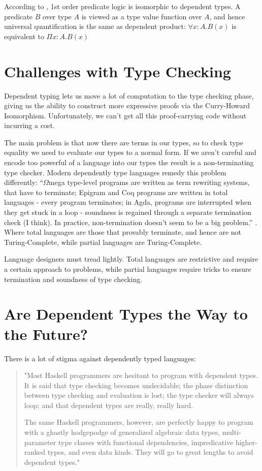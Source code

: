 According to \cite{attapl}, 1st order predicate logic is isomorphic to dependent types. A predicate $B$ over type $A$ is viewed as a type value function over $A$, and hence universal quantification is the same as dependent product: $\forall x : A . B(x) $ is equivalent to $\Pi x : A . B(x) $


\section{Challenges with Type Checking}
Dependent typing lets us move a lot of computation to the type checking phase, giving us the ability to construct more expressive proofs via the Curry-Howard Isomorphism. Unfortunately, we can't get all this proof-carrying code without incurring a cost.

The main problem is that now there are terms in our types, so to check type equality we need to evaluate our types to a normal form. If we aren't careful and encode too powerful of a language into our types the result is a non-terminating type checker. Modern dependently type languages remedy this problem differently: ``$\Omega$mega type-level programs are written as term rewriting systems, that have to terminate; Epigram and Coq programs are written in total languages - every program terminates; in Agda, programs are interrupted when they get stuck in a loop - soundness is regained through a separate termination check (I think). In practice, non-termination doesn't seem to be a big problem.'' \cite{eval}. Where total languages are those that provably terminate, and hence are not Turing-Complete, while partial languages are Turing-Complete.

Language designers must tread lightly. Total languages are restrictive and require a certain approach to problems, while partial languages require tricks to ensure termination and soundness of type checking.

\section{Are Dependent Types the Way to the Future?}
There is a lot of stigma against dependently typed languages:

\begin{quote}
"Most Haskell programmers are hesitant to program with dependent types. It is said that type checking becomes undecidable; the phase distinction between type checking and evaluation is lost; the type checker will always loop; and that dependent types are really, really hard.

The same Haskell programmers, however, are perfectly happy to program with a ghastly hodgepodge of generalized algebraic data types, multi-parameter type classes with functional dependencies, impredicative higher-ranked types, and even data kinds. They will go to great lengths to avoid dependent types." \cite{lambdaPi}
\end{quote}

